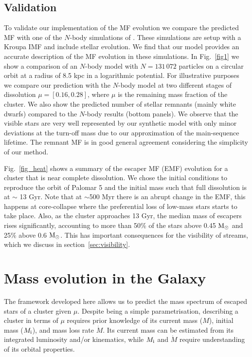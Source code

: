 \documentclass[useAMS,usenatbib,fleqn]{mnras}
\newcommand{\Mi}{M_{\rm i}}
\newcommand{\msun}{{\rm M}_\odot}
\newcommand{\comm}[1]{#1}
\begin{document}
\subsection{Validation}

To validate our implementation of the MF evolution we compare the predicted MF
with one of the $N$-body simulations of \citet{Lamers13}. These simulations are
setup with a Kroupa IMF \citep{Kroupa01} and include stellar evolution. We find
that our model provides an accurate description of the MF evolution in these
simulations.  In Fig.~\ref{fig1} we show a comparison of an $N$-body model with
$N=131\,072$ particles on a circular orbit at a radius of 8.5 kpc in a
logarithmic potential.  For illustrative purposes we compare our prediction with
the $N$-body model at two different stages of dissolution $\mu = [0.16, 0.28]$,
where $\mu$ is the remaining mass fraction of the cluster. We also show the
predicted number of \comm{stellar remnants (mainly white dwarfs)} compared to
the $N$-body results (bottom panels). We observe that the visible stars are very
well represented by our synthetic model with only minor deviations at the
turn-off mass due to our approximation of the main-sequence lifetime. The
remnant MF is in good general agreement considering the simplicity of our
method.

Fig.~\ref{fig_heat} shows a summary of the escaper MF (EMF) evolution for a
cluster that is near complete dissolution. We chose the initial conditions to
reproduce the orbit of Palomar 5 \citep{Kuepper15} and the initial mass such
that full dissolution is at $\sim$ 13 Gyr. Note that at $\sim$500 Myr there is
an abrupt change in the EMF, this happens at core-collapse where the
preferential loss of low-mass stars starts to take place. Also, as the cluster
approaches 13 Gyr, the median mass of escapers rises significantly, accounting
to more than 50\% of the stars above 0.45 $\msun$ and 25\% above 0.6 $\msun$.
This has important consequences for the visibility of streams, which we
discuss in section~\ref{sec:visibility}.

\section{Mass evolution in the Galaxy}

The framework developed here allows us to predict the mass spectrum of escaped
stars of a cluster given $\mu$. Despite being a simple parametrisation,
describing a cluster in terms of $\mu$ requires prior knowledge of its current
mass ($M$), initial mass ($\Mi$), and mass loss rate $\dot{M}$.  Its current
mass can be estimated from its integrated luminosity and/or kinematics, while
$\Mi$ and $\dot{M}$ require understanding of its orbital properties.
\end{document}
